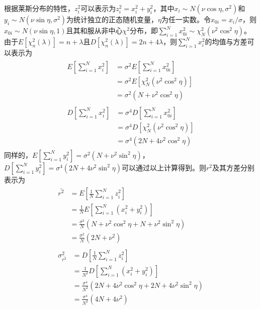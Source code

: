 根据莱斯分布的特性，$z_i^2$可以表示为$z_i^2=x_i^2+y_i^2$，其中$x_i \sim N(\nu\cos \eta,\sigma^2)$和$y_i \sim N(\nu\sin \eta,\sigma^2)$为统计独立的正态随机变量，$\eta$为任一实数。令$x_{0i}=x_i/\sigma$，则$x_{0i} \sim N(\nu \sin \eta,1)$且其和服从非中心$\chi^2$分布，即$\sum_{i=1}^{N}x_{0i}^2 \sim \chi_N^2(\nu^2\cos^2\eta)$。由于$E[\chi_n^2(\lambda)]=n+\lambda$且$D[\chi_n^2(\lambda)]=2n+4\lambda$，则$\sum_{i=1}^{N}x_i^2$的均值与方差可以表示为
\begin{subequations}
\begin{eqnarray}
\begin{split}
  E\left[\sum_{i=1}^{N}x_i^2\right]&=\sigma^2E\left[\sum_{i=1}^{N}x_{0i}^2\right] \\
  &=\sigma^2E\left[\chi_N^2(\nu^2\cos^2\eta)\right] \\
  &=\sigma^2\left(N+\nu^2\cos^2\eta\right)
\label{app:Ex}
\end{split} \\
\begin{split}
  D\left[\sum_{i=1}^{N}x_i^2\right]&=\sigma^4D\left[\sum_{i=1}^{N}x_{0i}^2\right] \\
  &=\sigma^4D\left[\chi_N^2(\nu^2\cos^2\eta)\right] \\
  &=\sigma^4\left(2N+4\nu^2\cos^2\eta\right)
\label{app:Dx}
\end{split}
\end{eqnarray}
\label{app:x}
\end{subequations}
同样的，$E[\sum_{i=1}^{N}y_i^2]=\sigma^2(N+\nu^2\sin^2\eta)$，$D[\sum_{i=1}^{N}y_i^2]=\sigma^4(2N+4\nu^2\sin^2\eta)$可以通过以上计算得到。则$r^2$及其方差分别表示为
\begin{subequations}
\begin{eqnarray}
\begin{split}
  \bar{r^2}&=E\left[\frac{1}{N}\sum_{i=1}^{N}z_i^2\right] \\
    &=\frac{1}{N}E\left[\sum_{i=1}^{N}(x_i^2+y_i^2)\right]\\
    &=\frac{\sigma^2}{N}\left(N+\nu^2\cos^2\eta+N+\nu^2\sin^2\eta\right)\\
    &=\frac{\sigma^2}{N}\left(2N+\nu^2\right)
  \label{app:Er2}
\end{split} \\
\begin{split}
  \sigma_{\bar{r^2}}^2&=D\left[\frac{1}{N}\sum_{i=1}^{N}z_i^2\right] \\
    &=\frac{1}{N^2}D\left[\sum_{i=1}^{N}\left(x_i^2+y_i^2\right)\right]\\
    &=\frac{\sigma^4}{N^2}\left(2N+4\nu^2\cos^2\eta+2N+4\nu^2\sin^2\eta\right)\\
    &=\frac{\sigma^4}{N^2}\left(4N+4\nu^2\right)
  \label{app:Dr2}
\end{split}
\end{eqnarray}
\label{app:r2}
\end{subequations}
